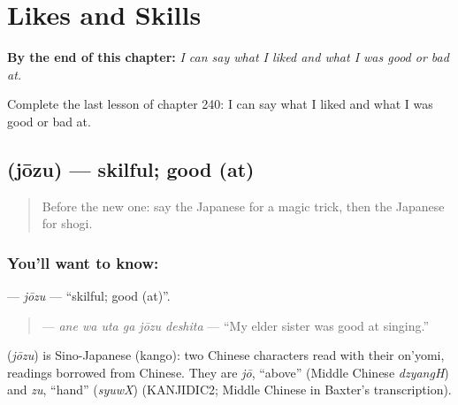 
\chapter{Likes and Skills}
\label{ch:ja-likes-and-skills}

\begin{chapteropening}
\textbf{By the end of this chapter:} \emph{I can say what I liked and what I was good or bad at.}

Complete the last lesson of chapter 240: I can say what I liked and what I was good or bad at.
\end{chapteropening}

\section[\texorpdfstring{\ja{じょうず} (jōzu)}{じょうず (jōzu)}]{ (jōzu) — skilful; good (at)}

\label{lesson:JA-C240-jouzu}



\begin{quote}
Before the new one: say the Japanese for a magic trick, then the Japanese for shogi.
\end{quote}

\subsection*{You'll want to know: }
\textbf{} — \emph{jōzu} — \textquotedblleft{}skilful; good (at)\textquotedblright{}.

\begin{quote}
\textbf{  } — \emph{ane wa uta ga jōzu deshita} — \textquotedblleft{}My elder sister was good at singing.\textquotedblright{}
\end{quote}

\begin{cousinweb}
\textbf{} (\emph{jōzu}) is Sino-Japanese (kango): two Chinese characters read with their on'yomi, readings borrowed from Chinese. They are \emph{jō}, \textquotedblleft{}above\textquotedblright{} (Middle Chinese \emph{dzyangH}) and \emph{zu}, \textquotedblleft{}hand\textquotedblright{} (\emph{syuwX}) (KANJIDIC2; Middle Chinese in Baxter's transcription).
\end{cousinweb}

